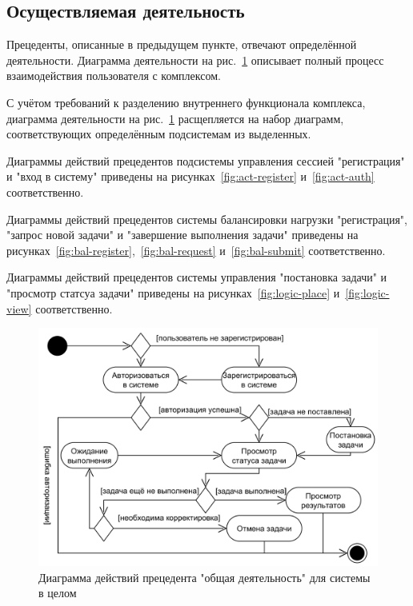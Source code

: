 \documentclass[a4paper,12pt]{report}
\numberwithin{equation}{section}
\begin{document}
  \subsection{Осуществляемая деятельность}
  Прецеденты, описанные в предыдущем пункте, отвечают определённой деятельности.
  Диаграмма деятельности на рис.~\ref{fig:act-common} описывает полный процесс взаимодействия пользователя с комплексом.
  
  С учётом требований к разделению внутреннего функционала комплекса, диаграмма деятельности на рис.~\ref{fig:act-common}
  расщепляется на набор диаграмм, соответствующих определённым подсистемам из выделенных.
  
  Диаграммы действий прецедентов подсистемы управления сессией "регистрация" и "вход в систему" приведены на рисунках~\ref{fig:act-register} и~\ref{fig:act-auth} соответственно.
  
  Диаграммы действий прецедентов системы балансировки нагрузки "регистрация", "запрос новой задачи" и "завершение выполнения задачи" приведены на рисунках~\ref{fig:bal-register},~\ref{fig:bal-request} и~\ref{fig:bal-submit} соответственно.
  
  Диаграммы действий прецедентов системы управления "постановка задачи" и "просмотр статсуа задачи" приведены на рисунках~\ref{fig:logic-place} и~\ref{fig:logic-view} соответственно.
  
  \begin{figure}[h]
    \centering
    \includegraphics[width=.9\linewidth]{diagrams/common/activity}
    \caption{Диаграмма действий прецедента "общая деятельность" для системы в целом}
    \label{fig:act-common}
  \end{figure}
  
\end{document}
